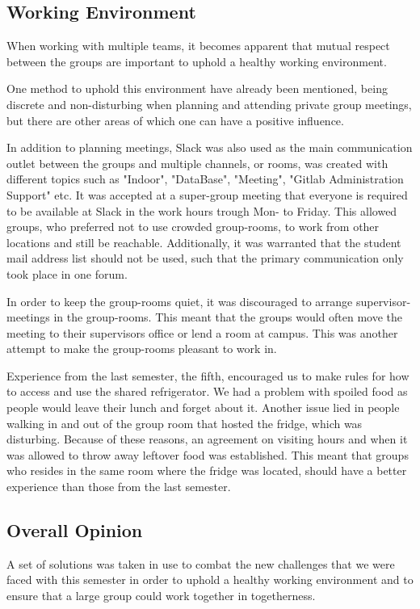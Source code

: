 \subsection{Working Environment}
When working with multiple teams, it becomes apparent that mutual respect between the groups are important to uphold a healthy working environment.

One method to uphold this environment have already been mentioned, being discrete and non-disturbing when planning and attending private group meetings, but there are other areas of which one can have a positive influence. 

In addition to planning meetings, Slack was also used as the main communication outlet between the groups and multiple channels, or rooms, was created with different topics such as "Indoor", "DataBase", "Meeting", "Gitlab Administration Support" etc. It was accepted at a super-group meeting that everyone is required to be available at Slack in the work hours trough Mon- to Friday. This allowed groups, who preferred not to use crowded group-rooms, to work from other locations and still be reachable. Additionally, it was warranted that the student mail address list should not be used, such that the primary communication only took place in one forum.  

In order to keep the group-rooms quiet, it was discouraged to arrange supervisor-meetings in the group-rooms. This meant that the groups would often move the meeting to their supervisors office or lend a room at campus. This was another attempt to make the group-rooms pleasant to work in.

Experience from the last semester, the fifth, encouraged us to make rules for how to access and use the shared refrigerator. We had a problem with spoiled food as people would leave their lunch and forget about it. Another issue lied in people walking in and out of the group room that hosted %
the fridge, which was disturbing. Because of these reasons, an agreement on visiting hours and when it was allowed to throw away leftover food was established. This meant that groups who resides in the same room where the fridge was located, should have a better experience than those from the last semester.

\subsection{Overall Opinion}
A set of solutions was taken in use to combat the new challenges that we were faced with this semester in order to uphold a healthy working environment and to ensure that a large group could work together in togetherness. %


